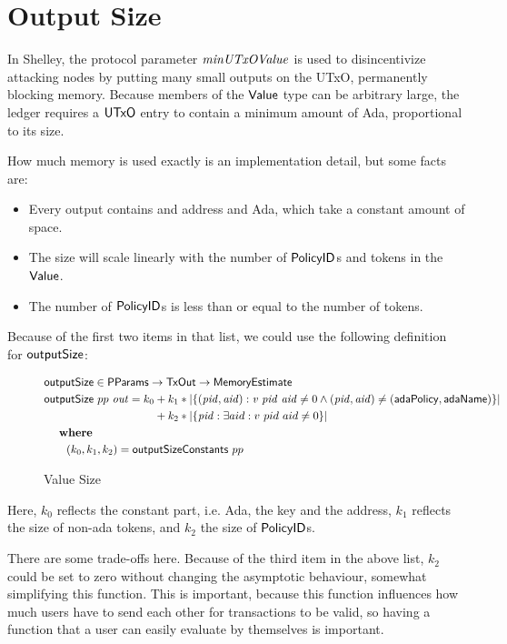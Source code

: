 \section{Output Size}
\label{sec:value-size}

In Shelley, the protocol parameter $\mathit{minUTxOValue}$ is used to
disincentivize attacking nodes by putting many small outputs on the
UTxO, permanently blocking memory. Because members of the $\mathsf{Value}$
type can be arbitrary large, the ledger requires a $\mathsf{UTxO}$ entry to
contain a minimum amount of Ada, proportional to its size.

How much memory is used exactly is an implementation detail, but some facts are:
\begin{itemize}
  \item Every output contains and address and Ada, which take a constant amount of space.
  \item The size will scale linearly with the number of $\mathsf{PolicyID}$s and tokens in the $\mathsf{Value}$.
  \item The number of $\mathsf{PolicyID}$s is less than or equal to the number of tokens.
\end{itemize}

Because of the first two items in that list, we could use the following definition for $\mathsf{outputSize}$:

\begin{figure*}[h]
  \begin{align*}
    & \fun{outputSize} \in \PParams \to \TxOut \to \MemoryEstimate \\
    & \fun{outputSize}~{pp}~\var{out} = k_0 + k_1 * |\{ (\var{pid}, \var{aid}) : \var{v}~\var{pid}~\var{aid} \neq 0
            \land (\var{pid}, \var{aid}) \neq (\mathsf{adaPolicy}, \mathsf{adaName}) \}| \\
    & \phantom{\fun{outputSize}~{pp}~\var{out} = k_0} + k_2 * |\{ \var{pid} : \exists aid : v~pid~aid \neq 0 \}| \\
    & ~~\where \\
    & ~~~~~~(k_0, k_1, k_2) = \fun{outputSizeConstants}~{pp}
  \end{align*}
  \caption{Value Size}
  \label{fig:test}
\end{figure*}

Here, $k_0$ reflects the constant part, i.e. Ada, the key and the address, $k_1$ reflects the
size of non-ada tokens, and $k_2$ the size of $\mathsf{PolicyID}$s.

There are some trade-offs here. Because of the third item in the above
list, $k_2$ could be set to zero without changing the asymptotic
behaviour, somewhat simplifying this function. This is important,
because this function influences how much users have to send each
other for transactions to be valid, so having a function that a user
can easily evaluate by themselves is important.
